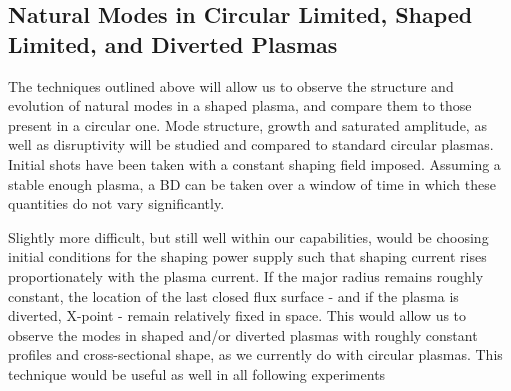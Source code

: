 \documentclass[aps,preprint,showpacs,superscriptaddress,groupedaddress]{revtex4}  %
\begin{document}
	\subsection{Natural Modes in Circular Limited, Shaped Limited, and Diverted Plasmas}		
	The techniques outlined above will allow us to observe the structure and evolution of natural modes in a shaped plasma, and compare them to those present in a circular one.  Mode structure, growth and saturated amplitude, as well as disruptivity will be studied and compared to standard circular plasmas. Initial shots have been taken with a constant shaping field imposed.  Assuming a stable enough plasma, a BD can be taken over a window of time in which these quantities do not vary significantly.\par
	Slightly more difficult, but still well within our capabilities, would be choosing initial conditions for the shaping power supply such that shaping current rises proportionately with the plasma current.  If the major radius remains roughly constant, the location of the last closed flux surface - and if the plasma is diverted, X-point - remain relatively fixed in space.  This would allow us to observe the modes in shaped and/or diverted plasmas with roughly constant profiles and cross-sectional shape, as we currently do with circular plasmas.  This technique would be useful as well in all following experiments\par
\end{document}
